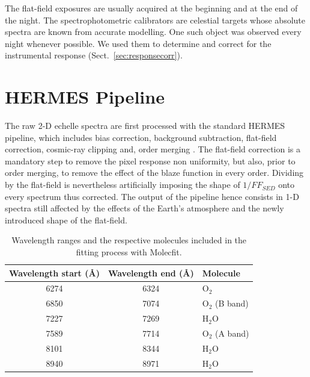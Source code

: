 The flat-field exposures are usually acquired at the beginning and at the end of the night. The spectrophotometric calibrators are celestial targets whose absolute spectra are known from accurate modelling. One such object was observed every night whenever possible. We used them to determine and correct for the instrumental response (Sect.~\ref{sec:responsecorr}).

\section{HERMES Pipeline}
The raw 2-D echelle spectra are first processed with the standard HERMES pipeline, which includes bias correction, background subtraction, flat-field correction, cosmic-ray clipping and, order merging \citep{raskin_hermes_2011}. The flat-field correction is a mandatory step to remove the pixel response non
uniformity, but also, prior to order merging, to remove the effect of the blaze function in every order. Dividing by the flat-field is nevertheless artificially imposing the shape of $1 / FF_{SED}$ onto every spectrum thus corrected. The output of the pipeline hence consists in 1-D spectra still affected by the effects of the Earth's atmosphere and the newly introduced shape of the flat-field. 


\begin{table}[ht]
\centering
\caption{Wavelength ranges and the respective molecules included in the fitting process with Molecfit.}
\begin{tabular}{ccl}
\hline \hline
Wavelength start (\AA) & Wavelength end (\AA) & Molecule \\
\hline
6274 & 6324 & O$_2$     \\
6850 & 7074 & O$_2$ (B band)     \\
7227 & 7269 & H$_2$O    \\
7589 & 7714 & O$_2$ (A band)    \\
8101 & 8344 & H$_2$O    \\
8940 & 8971 & H$_2$O    \\
\hline
\end{tabular}
\label{tab:molecfitranges}
\end{table}


